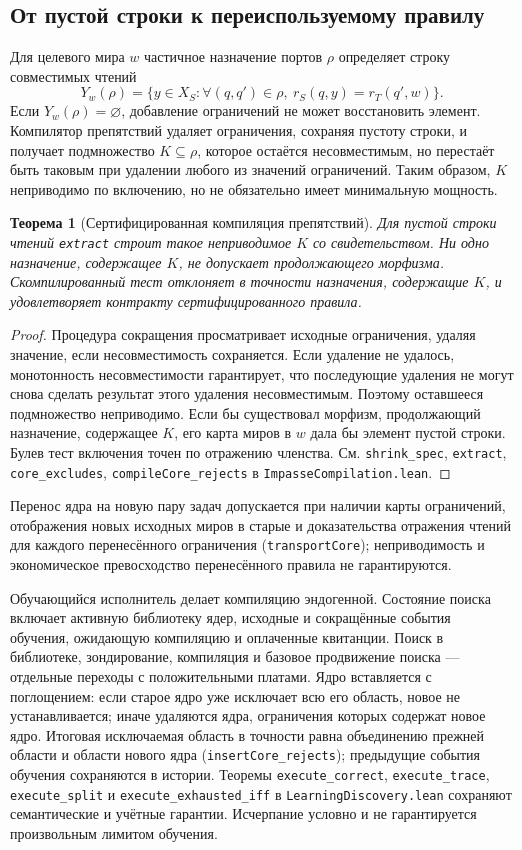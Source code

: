\documentclass[10pt,a4paper]{article}
\newtheorem{theorem}{Теорема}[section]
\newcommand{\rc}[1]{\allowbreak\texttt{#1}\allowbreak}
\begin{document}
\subsection{От пустой строки к переиспользуемому правилу}
Для целевого мира $w$ частичное назначение портов $\rho$ определяет строку совместимых чтений
\[
 Y_w(\rho)=\{y\in X_S: \forall(q,q')\in\rho,\ r_S(q,y)=r_T(q',w)\}.
\]
Если $Y_w(\rho)=\varnothing$, добавление ограничений не может восстановить элемент. Компилятор препятствий удаляет ограничения, сохраняя пустоту строки, и получает подмножество $K\subseteq\rho$, которое остаётся несовместимым, но перестаёт быть таковым при удалении любого из значений ограничений. Таким образом, $K$ неприводимо по включению, но не обязательно имеет минимальную мощность.
\begin{theorem}[Сертифицированная компиляция препятствий]\label{thm:core}
Для пустой строки чтений \rc{extract} строит такое неприводимое $K$ со свидетельством. Ни одно назначение, содержащее $K$, не допускает продолжающего морфизма. Скомпилированный тест отклоняет в точности назначения, содержащие $K$, и удовлетворяет контракту сертифицированного правила.
\end{theorem}
\begin{proof}
Процедура сокращения просматривает исходные ограничения, удаляя значение, если несовместимость сохраняется. Если удаление не удалось, монотонность несовместимости гарантирует, что последующие удаления не могут снова сделать результат этого удаления несовместимым. Поэтому оставшееся подмножество неприводимо. Если бы существовал морфизм, продолжающий назначение, содержащее $K$, его карта миров в $w$ дала бы элемент пустой строки. Булев тест включения точен по отражению членства. См. \rc{shrink\_spec}, \rc{extract}, \rc{core\_excludes}, \rc{compileCore\_rejects} в \rc{ImpasseCompilation.lean}.
\end{proof}
Перенос ядра на новую пару задач допускается при наличии карты ограничений, отображения новых исходных миров в старые и доказательства отражения чтений для каждого перенесённого ограничения (\rc{transportCore}); неприводимость и экономическое превосходство перенесённого правила не гарантируются.

Обучающийся исполнитель делает компиляцию эндогенной. Состояние поиска включает активную библиотеку ядер, исходные и сокращённые события обучения, ожидающую компиляцию и оплаченные квитанции. Поиск в библиотеке, зондирование, компиляция и базовое продвижение поиска --- отдельные переходы с положительными платами. Ядро вставляется с поглощением: если старое ядро уже исключает всю его область, новое не устанавливается; иначе удаляются ядра, ограничения которых содержат новое ядро. Итоговая исключаемая область в точности равна объединению прежней области и области нового ядра (\rc{insertCore\_rejects}); предыдущие события обучения сохраняются в истории. Теоремы \rc{execute\_correct}, \rc{execute\_trace}, \rc{execute\_split} и \rc{execute\_exhausted\_iff} в \rc{LearningDiscovery.lean} сохраняют семантические и учётные гарантии. Исчерпание условно и не гарантируется произвольным лимитом обучения.
\end{document}
